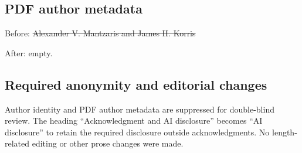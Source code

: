 \documentclass{llncs}
\providecommand{\DIFdeltex}[1]{{\protect\color{red}\sout{#1}}}                      %
\providecommand{\DIFdel}[1]{\texorpdfstring{\DIFdeltex{#1}}{}} %
\begin{document}
\subsection*{PDF author metadata}
Before: \DIFdel{Alexander V. Mantzaris and James H. Korris}\par
After: empty.

\subsection*{Required anonymity and editorial changes}
Author identity and PDF author metadata are suppressed for double-blind review.
The heading ``Acknowledgment and AI disclosure'' becomes ``AI disclosure''
to retain the required disclosure outside acknowledgments. No length-related
editing or other prose changes were made.
\end{document}
